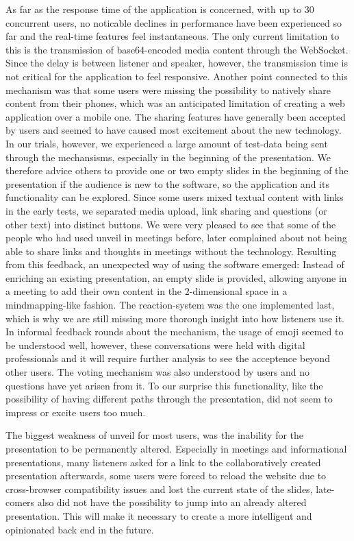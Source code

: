 As far as the response time of the application is concerned, with up to 30 concurrent users, no noticable declines in performance have been experienced so far and the real-time features feel instantaneous. The only current limitation to this is the transmission of base64-encoded media content through the WebSocket. Since the delay is between listener and speaker, however, the transmission time is not critical for the application to feel responsive. Another point connected to this mechanism was that some users were missing the possibility to natively share content from their phones, which was an anticipated limitation of creating a web application over a mobile one.
The sharing features have generally been accepted by users and seemed to have caused most excitement about the new technology. In our trials, however, we experienced a large amount of test-data being sent through the mechansisms, especially in the beginning of the presentation. We therefore advice others to provide one or two empty slides in the beginning of the presentation if the audience is new to the software, so the application and its functionality can be explored. Since some users mixed textual content with links in the early tests, we separated media upload, link sharing and questions (or other text) into distinct buttons. We were very pleased to see that some of the people who had used unveil in meetings before, later complained about not being able to share links and thoughts in meetings without the technology. Resulting from this feedback, an unexpected way of using the software emerged: Instead of enriching an existing presentation, an empty slide is provided, allowing anyone in a meeting to add their own content in the $2$-dimensional space in a mindmapping-like fashion.
The reaction-system was the one implemented last, which is why we are still missing more thorough insight into how listeners use it. In informal feedback rounds about the mechanism, the usage of emoji seemed to be understood well, however, these conversations were held with digital professionals and it will require further analysis to see the acceptence beyond other users.
The voting mechanism was also understood by users and no questions have yet arisen from it. To our surprise this functionality, like the possibility of having different paths through the presentation, did not seem to impress or excite users too much.

The biggest weakness of unveil for most users, was the inability for the presentation to be permanently altered. Especially in meetings and informational presentations, many listeners asked for a link to the collaboratively created presentation afterwards, some users were forced to reload the website due to cross-browser compatibility issues and lost the current state of the slides, late-comers also did not have the possibility to jump into an already altered presentation. This will make it necessary to create a more intelligent and opinionated back end in the future.

